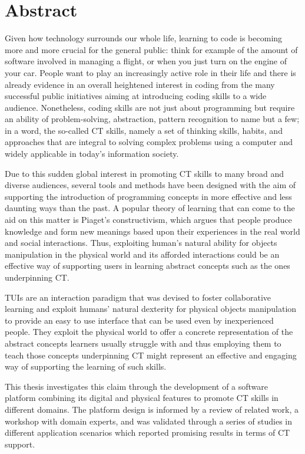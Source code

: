 %
\chapter*{Abstract}\label{sec:abstract}
\vspace*{-10mm}

Given how technology surrounds our whole life, learning to code is becoming more and more crucial for the general public: think for example of the amount of software involved in managing a flight, or when you just turn on the engine of your car. People want to play an increasingly active role in their life and there is already evidence in an overall heightened interest in coding from the many successful public initiatives aiming at introducing coding skills to a wide audience. Nonetheless, coding skills are not just about programming but require an ability of problem-solving, abstraction, pattern recognition to name but a few; in a word, the so-called \ac{CT} skills, namely a set of thinking skills, habits, and approaches that are integral to solving complex problems using a computer and widely applicable in today's information society.

Due to this sudden global interest in promoting \ac{CT} skills to many broad and diverse audiences, several tools and methods have been designed with the aim of supporting the introduction of programming concepts in more effective and less daunting ways than the past. A popular theory of learning that can come to the aid on this matter is Piaget's constructivism, which argues that people produce knowledge and form new meanings based upon their experiences in the real world and social interactions. Thus, exploiting human's natural ability for objects manipulation in the physical world and its afforded interactions could be an effective way of supporting users in learning abstract concepts such as the ones underpinning \ac{CT}.

\aclp{TUI} are an interaction paradigm that was devised to foster collaborative learning and exploit humans' natural dexterity for physical objects manipulation to provide an easy to use interface that can be used even by inexperienced people. They exploit the physical world to offer a concrete representation of the abstract concepts learners usually struggle with and thus employing them to teach those concepts underpinning \ac{CT} might represent an effective and engaging way of supporting the learning of such skills.

This thesis investigates this claim through the development of a software platform combining its digital and physical features to promote \ac{CT} skills in different domains. The platform design is informed by a review of related work, a workshop with domain experts, and was validated through a series of studies in different application scenarios which reported promising results in terms of \ac{CT} support.